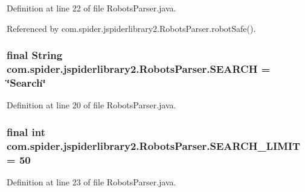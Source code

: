 \-Definition at line 22 of file \-Robots\-Parser.\-java.



\-Referenced by com.\-spider.\-jspiderlibrary2.\-Robots\-Parser.\-robot\-Safe().

\hypertarget{classcom_1_1spider_1_1jspiderlibrary2_1_1_robots_parser_a0455347c6ace914cb64885d5cb4e051b}{
\subsubsection[{\-S\-E\-A\-R\-C\-H}]{\setlength{\rightskip}{0pt plus 5cm}final \-String {\bf com.\-spider.\-jspiderlibrary2.\-Robots\-Parser.\-S\-E\-A\-R\-C\-H} = \char`\"{}\-Search\char`\"{}}}\label{classcom_1_1spider_1_1jspiderlibrary2_1_1_robots_parser_a0455347c6ace914cb64885d5cb4e051b}


\-Definition at line 20 of file \-Robots\-Parser.\-java.

\hypertarget{classcom_1_1spider_1_1jspiderlibrary2_1_1_robots_parser_ad78a55ba0cb474ee527ee4c2a73c3923}{
\subsubsection[{\-S\-E\-A\-R\-C\-H\-\_\-\-L\-I\-M\-I\-T}]{\setlength{\rightskip}{0pt plus 5cm}final int {\bf com.\-spider.\-jspiderlibrary2.\-Robots\-Parser.\-S\-E\-A\-R\-C\-H\-\_\-\-L\-I\-M\-I\-T} = 50}}\label{classcom_1_1spider_1_1jspiderlibrary2_1_1_robots_parser_ad78a55ba0cb474ee527ee4c2a73c3923}


\-Definition at line 23 of file \-Robots\-Parser.\-java.

